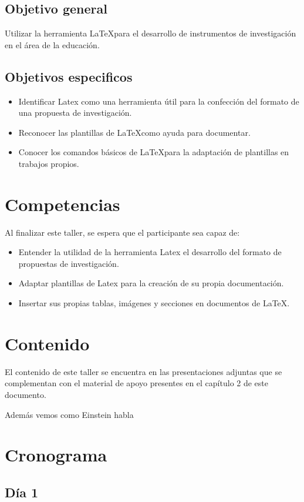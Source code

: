 \documentclass[12pt]{report}
\begin{document}
\subsection{Objetivo general}
Utilizar la herramienta \LaTeX para el desarrollo de instrumentos de investigación en el área de la educación.
\subsection{Objetivos especificos}
\begin{itemize}
\item Identificar Latex como una herramienta útil para la confección del formato de una propuesta de investigación.
\item Reconocer las plantillas de \LaTeX como ayuda para documentar.
\item Conocer los comandos básicos de \LaTeX para la adaptación de plantillas en trabajos propios.
\end{itemize}

\section{Competencias}
Al finalizar este taller, se espera que el participante sea capaz de:
\begin{itemize}
\item Entender la utilidad de la herramienta Latex el desarrollo del formato de propuestas de investigación.
\item Adaptar plantillas de Latex para la creación de su propia documentación.
\item Insertar sus propias tablas, imágenes y secciones en documentos de \LaTeX.
\end{itemize}

\section{Contenido} 
El contenido de este taller se encuentra en las presentaciones adjuntas que se complementan con el material de apoyo presentes en el capítulo 2 de este documento.\cite{greenwade93}

Además vemos como Einstein habla \cite{Einstein}
\section{Cronograma}
\subsection{Día 1}
\end{document}
